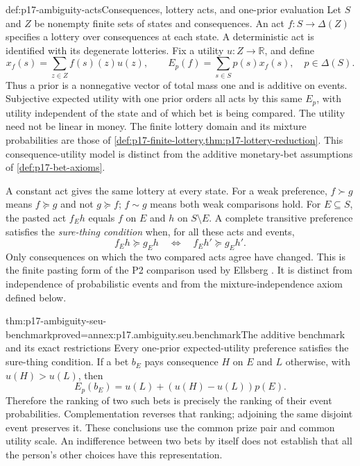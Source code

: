 \begin{hbdefinition}{def:p17-ambiguity-acts}{Consequences, lottery acts, and one-prior evaluation}
Let \(S\) and \(Z\) be nonempty finite sets of states and consequences.
An act \(f:S\to\Delta(Z)\) specifies a lottery over consequences at
each state. A deterministic act is identified with its degenerate
lotteries. Fix a utility \(u:Z\to\mathbb R\), and define
\[
 x_f(s)=\sum_{z\in Z}f(s)(z)u(z),\qquad
 E_p(f)=\sum_{s\in S}p(s)x_f(s),\quad p\in\Delta(S).
\]
Thus a prior is a nonnegative vector of total mass one and is
additive on events. Subjective expected utility with one prior
orders all acts by this same \(E_p\), with utility independent
of the state and of which bet is being compared.
The utility need not be linear in money.
The finite lottery domain and its mixture probabilities are
those of \cref{def:p17-finite-lottery,thm:p17-lottery-reduction}.
This consequence-utility model is distinct from the additive
monetary-bet assumptions of \cref{def:p17-bet-axioms}.

A constant act gives the same lottery at every state.
For a weak preference, \(f\succ g\) means
\(f\succeq g\) and not \(g\succeq f\); \(f\sim g\)
means both weak comparisons hold.
For \(E\subseteq S\), the pasted act \(f_Eh\) equals \(f\)
on \(E\) and \(h\) on \(S\setminus E\).
A complete transitive preference satisfies the
\emph{sure-thing condition} when, for all these acts and events,
\[
       f_Eh\succeq g_Eh
                  \quad\Longleftrightarrow\quad
       f_Eh'\succeq g_Eh'.
\]
Only consequences on which the two compared acts agree have
changed. This is the finite pasting form of the P2 comparison
used by Ellsberg \cite[pp.~648--649]{Ellsberg1961Ambiguity}.
It is distinct from independence of probabilistic events and
from the mixture-independence axiom defined below.
\end{hbdefinition}

\begin{hblemma}{thm:p17-ambiguity-seu-benchmark}{proved=annex:p17.ambiguity.seu.benchmark}{The additive benchmark and its exact restrictions}
Every one-prior expected-utility preference satisfies the
sure-thing condition. If a bet \(b_E\) pays consequence \(H\)
on \(E\) and \(L\) otherwise, with \(u(H)>u(L)\), then
\[
              E_p(b_E)=u(L)+(u(H)-u(L))p(E).
\]
Therefore the ranking of two such bets is precisely the
ranking of their event probabilities. Complementation reverses
that ranking; adjoining the same disjoint event preserves it.
These conclusions use the common prize pair and common utility
scale. An indifference between two bets by itself does not
establish that all the person's other choices have this representation.
\end{hblemma}

